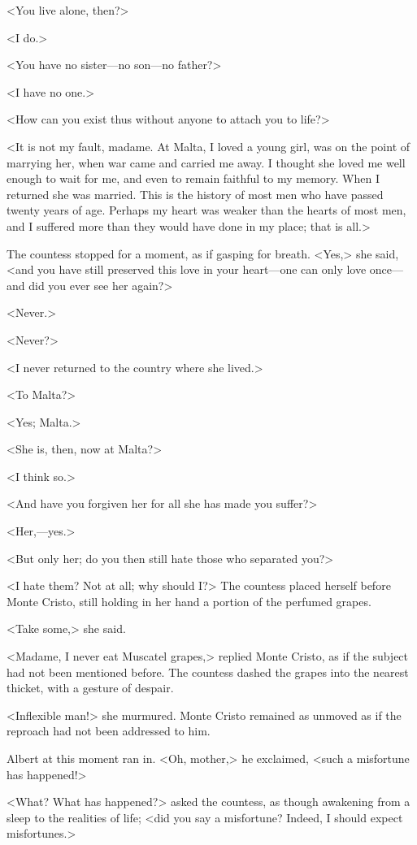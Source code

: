  <You live alone, then?> 

 <I do.> 

 <You have no sister—no son—no father?> 

 <I have no one.> 

 <How can you exist thus without anyone to attach you to life?> 

 <It is not my fault, madame. At Malta, I loved a young girl, was on the point of marrying her, when war came and carried me away. I thought she loved me well enough to wait for me, and even to remain faithful to my memory. When I returned she was married. This is the history of most men who have passed twenty years of age. Perhaps my heart was weaker than the hearts of most men, and I suffered more than they would have done in my place; that is all.> 

 The countess stopped for a moment, as if gasping for breath. <Yes,> she said, <and you have still preserved this love in your heart—one can only love once—and did you ever see her again?>

<Never.> 

 <Never?> 

 <I never returned to the country where she lived.> 

 <To Malta?> 

 <Yes; Malta.> 

 <She is, then, now at Malta?> 

 <I think so.> 

 <And have you forgiven her for all she has made you suffer?> 

 <Her,—yes.> 

 <But only her; do you then still hate those who separated you?> 

 <I hate them? Not at all; why should I?> The countess placed herself before Monte Cristo, still holding in her hand a portion of the perfumed grapes. 

 <Take some,> she said. 

 <Madame, I never eat Muscatel grapes,> replied Monte Cristo, as if the subject had not been mentioned before. The countess dashed the grapes into the nearest thicket, with a gesture of despair. 

 <Inflexible man!> she murmured. Monte Cristo remained as unmoved as if the reproach had not been addressed to him. 

 Albert at this moment ran in. <Oh, mother,> he exclaimed, <such a misfortune has happened!> 

 <What? What has happened?> asked the countess, as though awakening from a sleep to the realities of life; <did you say a misfortune? Indeed, I should expect misfortunes.> 

